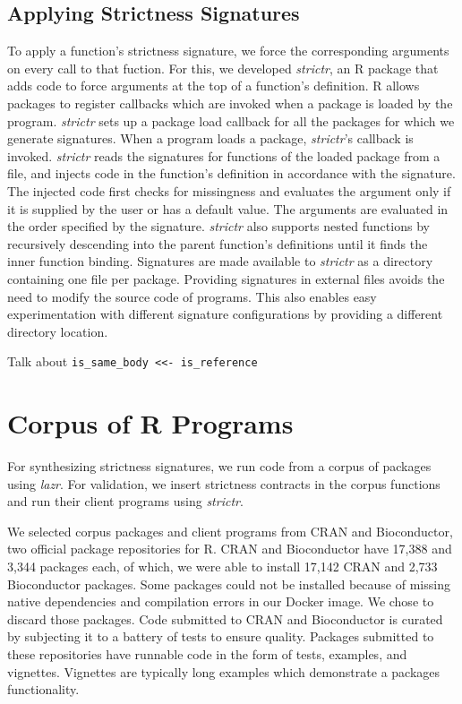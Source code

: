 \documentclass[screen,acmsmall]{acmart}
\newcommand{\code}[1]{\lstinline[style=R]|#1|\xspace}
\newcommand{\lazr}{\emph{lazr}}
\newcommand{\strictr}{\emph{strictr}}
\begin{document}
\subsection{Applying Strictness Signatures}

To apply a function's strictness signature, we force the corresponding
arguments on every call to that fuction. For this, we developed \emph{strictr},
an R package that adds code to force arguments at the top of a function's
definition. R allows packages to register callbacks which are invoked when a
package is loaded by the program. \emph{strictr} sets up a package load callback
for all the packages for which we generate signatures. When a program loads a
package, \emph{strictr}'s callback is invoked. \emph{strictr} reads the
signatures for functions of the loaded package from a file, and injects code in
the function's definition in accordance with the signature. The injected code
first checks for missingness and evaluates the argument only if it is supplied
by the user or has a default value. The arguments are evaluated in the order
specified by the signature. \emph{strictr} also supports nested functions by
recursively descending into the parent function's definitions until it finds the
inner function binding. Signatures are made available to \emph{strictr} as a
directory containing one file per package. Providing signatures in external
files avoids the need to modify the source code of programs. This also enables
easy experimentation with different signature configurations by providing a
different directory location.

Talk about  \code{is_same_body <<- is_reference}


\section{Corpus of R Programs}

For synthesizing strictness signatures, we run code from a corpus of packages
using \lazr. For validation, we insert strictness contracts in the corpus
functions and run their client programs using \strictr.

We selected corpus packages and client programs from CRAN and Bioconductor, two
official package repositories for R. CRAN and Bioconductor have 17,388 and 3,344
packages each, of which, we were able to install 17,142 CRAN and 2,733
Bioconductor packages. Some packages could not be installed because of missing
native dependencies and compilation errors in our Docker image. We chose to
discard those packages. Code submitted to CRAN and Bioconductor is curated by
subjecting it to a battery of tests to ensure quality. Packages submitted to
these repositories have runnable code in the form of tests, examples, and
vignettes. Vignettes are typically long examples which demonstrate a packages
functionality.
\end{document}
